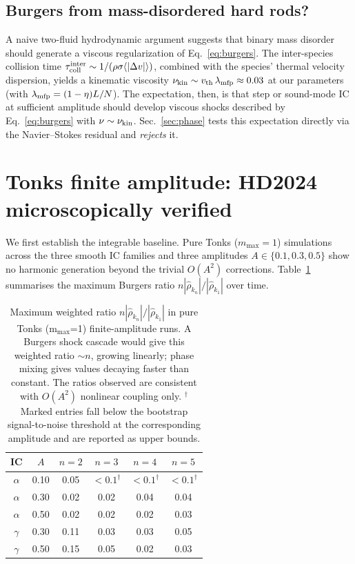 \documentclass[aps,pre,twocolumn,superscriptaddress,longbibliography,floatfix]{revtex4-2}
\begin{document}
\subsection{Burgers from mass-disordered hard rods?}

A naive two-fluid hydrodynamic argument suggests that binary
mass disorder should generate a viscous regularization of
Eq.~\eqref{eq:burgers}. The inter-species collision time
$\tau_{\rm coll}^{\rm inter}\sim
1/(\rho\sigma\langle|\Delta v|\rangle)$, combined with the
species' thermal velocity dispersion, yields a kinematic
viscosity
$\nu_{\rm kin}\sim v_{\rm th}\,\lambda_{\rm mfp}\approx 0.03$
at our parameters (with $\lambda_{\rm mfp}=(1-\eta)L/N$). The
expectation, then, is that step or sound-mode IC at sufficient
amplitude should develop viscous shocks described by
Eq.~\eqref{eq:burgers} with $\nu\sim\nu_{\rm kin}$.
Sec.~\ref{sec:phase} tests this expectation directly via the
Navier--Stokes residual and \emph{rejects} it.

\section{Tonks finite amplitude: HD2024 microscopically verified}
\label{sec:tonks}

We first establish the integrable baseline. Pure Tonks
($m_{\max}=1$) simulations across the three smooth IC families
and three amplitudes $A\in\{0.1,0.3,0.5\}$ show no harmonic
generation beyond the trivial $O(A^2)$ corrections.
Table~\ref{tab:tonks} summarises the maximum Burgers ratio
$n|\hat\rho_{k_n}|/|\hat\rho_{k_1}|$ over time.

\begin{table}[t]
\centering
\caption{Maximum weighted ratio
$n|\hat\rho_{k_n}|/|\hat\rho_{k_1}|$ in pure Tonks
(m$_{\max}$=1) finite-amplitude runs. A Burgers shock cascade
would give this weighted ratio $\sim n$, growing linearly; phase
mixing gives values decaying faster than constant. The ratios
observed are consistent with $O(A^2)$ nonlinear coupling only.
$^\dagger$Marked entries fall below the bootstrap signal-to-noise
threshold at the corresponding amplitude and are reported as
upper bounds.}
\label{tab:tonks}
\begin{tabular}{cccccc}
\hline\hline
IC & $A$ & $n=2$ & $n=3$ & $n=4$ & $n=5$\\
\hline
$\alpha$ & 0.10 & 0.05 & $<\!0.1^\dagger$ & $<\!0.1^\dagger$ & $<\!0.1^\dagger$\\
$\alpha$ & 0.30 & 0.02 & 0.02 & 0.04 & 0.04\\
$\alpha$ & 0.50 & 0.02 & 0.02 & 0.02 & 0.03\\
$\gamma$ & 0.30 & 0.11 & 0.03 & 0.03 & 0.05\\
$\gamma$ & 0.50 & 0.15 & 0.05 & 0.02 & 0.03\\
\hline\hline
\end{tabular}
\end{table}
\end{document}
